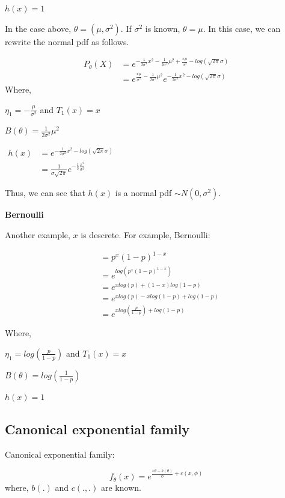 \documentclass[]{book}
\begin{document}
\(h(x)=1\)

In the case above, \(\theta=(\mu, \sigma^2)\). If \(\sigma^2\) is known,
\(\theta=\mu\). In this case, we can rewrite the normal pdf as follows.

\[\begin{aligned} P_{\theta}(X) &=e^{-\frac{1}{2\sigma^2}x^2-\frac{1}{2\sigma^2} \mu^2+\frac{x\mu}{\sigma^2}-log(\sqrt{2\pi}\sigma)}\\ &=e^{\frac{x\mu}{\sigma^2}-\frac{1}{2\sigma^2} \mu^2}e^{-\frac{1}{2\sigma^2}x^2-log(\sqrt{2\pi}\sigma)} \end{aligned}\]
Where,

\(\eta_1 =-\frac{\mu}{\sigma^2}\) and \(T_1(x)=x\)

\(B(\theta)=\frac{1}{2\sigma^2} \mu^2\)

\(\begin{aligned} h(x) &=e^{-\frac{1}{2\sigma^2}x^2-log(\sqrt{2\pi}\sigma)} \\&=\frac{1}{\sigma\sqrt{2\pi}}e^{-\frac{1}{2}\frac{x^2}{\sigma^2}} \end{aligned}\)

Thus, we can see that \(h(x)\) is a normal pdf \(\sim N(0, \sigma^2)\).

\textbf{Bernoulli}

Another example, \(x\) is descrete. For example, Bernoulli:

\[ \begin{aligned} &= p^x(1-p)^{1-x}  \\ &=e^{log(p^x(1-p)^{1-x})} \\ &= e^{xlog(p)+(1-x)log(1-p)}\\ &= e^{xlog(p)-xlog(1-p)+log(1-p)}\\ &=e^{xlog(\frac{p}{1-p})+log(1-p)} \end{aligned}\]

Where,

\(\eta_1 =log(\frac{p}{1-p})\) and \(T_1(x)=x\)

\(B(\theta)=log(\frac{1}{1-p})\)

\(h(x) =1\)

\subsection{Canonical exponential
family}\label{canonical-exponential-family}

Canonical exponential family:

\[f_{\theta}(x)=e^{\frac{x\theta-b(\theta)}{\phi}+c(x,\phi)}\] where,
\(b(.)\) and \(c(.,.)\) are known.
\end{document}
